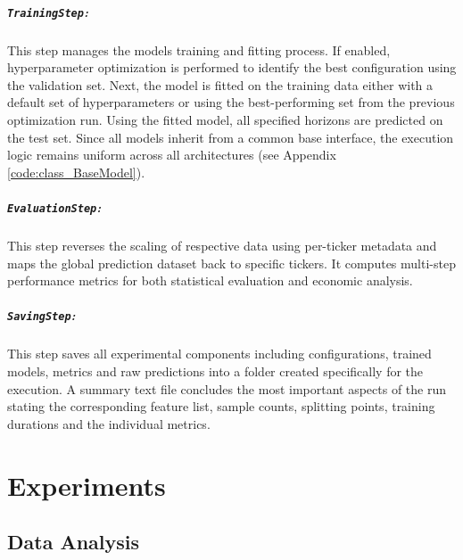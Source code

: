 \documentclass[12pt,twoside=false,a4paper,parskip]{scrbook}
\begin{document}
\paragraph{\texttt{TrainingStep}:}
This step manages the models training and fitting process. If enabled, hyperparameter optimization is performed to identify the best configuration using the validation set. 
Next, the model is fitted on the training data either with a default set of hyperparameters or using the best-performing set from the previous optimization run. Using the fitted model, all specified horizons are predicted on the test set. Since all models inherit from a common base interface, the execution logic remains uniform across all architectures (see Appendix \ref{code:class_BaseModel}). 

\paragraph{\texttt{EvaluationStep}:}
This step reverses the scaling of respective data using per-ticker metadata and maps the global prediction dataset back to specific tickers. It computes multi-step performance metrics for both statistical evaluation and economic analysis.

\paragraph{\texttt{SavingStep}:}
This step saves all experimental components including configurations, trained models, metrics and raw predictions into a folder created specifically for the execution. A summary text file concludes the most important aspects of the run stating the corresponding feature list, sample counts, splitting points, training durations and the individual metrics. 





\chapter{Experiments}
\label{ch:experiments}



\section{Data Analysis}
\end{document}
